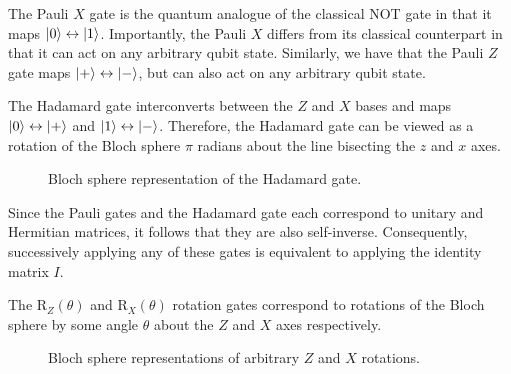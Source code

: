 The Pauli $X$ gate is the quantum analogue of the classical NOT gate in that it maps $\ket 0 \leftrightarrow \ket 1$. Importantly, the Pauli $X$ differs from its classical counterpart in that it can act on any arbitrary qubit state. Similarly, we have that the Pauli $Z$ gate maps $\ket + \leftrightarrow \ket -$, but can also act on any arbitrary qubit state.

The Hadamard gate interconverts between the $Z$ and $X$ bases and maps $\ket 0 \leftrightarrow \ket +$ and $\ket 1 \leftrightarrow \ket -$. Therefore, the Hadamard gate can be viewed as a rotation of the Bloch sphere $\pi$ radians about the line bisecting the $z$ and $x$ axes.

\begin{figure}[H]
    \centering
    \caption{Bloch sphere representation of the Hadamard gate.}
    \label{hadamard-definition}
\end{figure}

Since the Pauli gates and the Hadamard gate each correspond to unitary and Hermitian matrices, it follows that they are also self-inverse. Consequently, successively applying any of these gates is equivalent to applying the identity matrix $I$.

The R$_Z(\theta)$ and R$_X(\theta)$ rotation gates correspond to rotations of the Bloch sphere by some angle $\theta$ about the $Z$ and $X$ axes respectively.

\begin{figure}[H]
    \centering
    \begin{minipage}{0.45\textwidth}
        \centering
    \end{minipage}
    \begin{minipage}{0.45\textwidth}
        \centering
    \end{minipage}
    \caption{Bloch sphere representations of arbitrary $Z$ and $X$ rotations.}
    \label{z-rotation-definition}
    \label{x-rotation-definition}
\end{figure}

